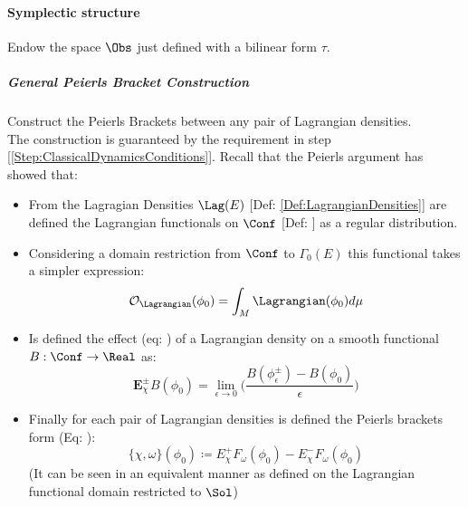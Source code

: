 \documentclass[Main]{subfiles}
\begin{document}
		\paragraph{Symplectic structure}
			Endow the space $\Obs$ just defined with a bilinear form $\tau$.
			\subparagraph{General Peierls Bracket Construction}
			Construct the Peierls Brackets between any pair of Lagrangian densities.\\
   							The construction is guaranteed by the requirement in step [\ref{Step:ClassicalDynamicsConditions}].
				Recall that the Peierls argument has showed that:
				\begin{itemize}
					\item From the Lagragian Densities $\Lag(E)$ [Def: \ref{Def:LagrangianDensities}] are defined the Lagrangian functionals on $\Conf$ [Def: \label{Def:LagrangianFunctionals}] as a regular distribution.
					\item Considering a domain restriction from $\Conf$ to $\Gamma_0(E)$  this functional takes a simpler expression:
					\begin{displaymath}
						\mathcal{O}_\Lagrangian( \phi_0) = \int_M \Lagrangian(\phi_0) d\mu
					\end{displaymath}
					\item Is defined the effect (eq: \label{EffectOperator}) of a Lagrangian density  on a smooth functional $B: \Conf \rightarrow \Real$ as:
						\begin{displaymath}
							\mathbf{E}_\chi^\pm B (\phi_0) = \lim_{\epsilon\rightarrow 0} \big( \frac{B(\phi_\epsilon^\pm) - B (\phi_0)} {\epsilon} \big)
						\end{displaymath}
					\item Finally for each pair of Lagrangian densities is defined the Peierls brackets form (Eq: \label{AbstractPeierlsBracket}):
						\begin{displaymath}
							\{\chi, \omega \}(\phi_0) \coloneqq E_\chi^+ F_\omega (\phi_0) - E_\chi^- F_\omega(\phi_0)
						\end{displaymath}
						(It can be seen in an equivalent manner as defined on the Lagrangian functional domain restricted to $\Sol$)
				\end{itemize}				 
		
\end{document}
